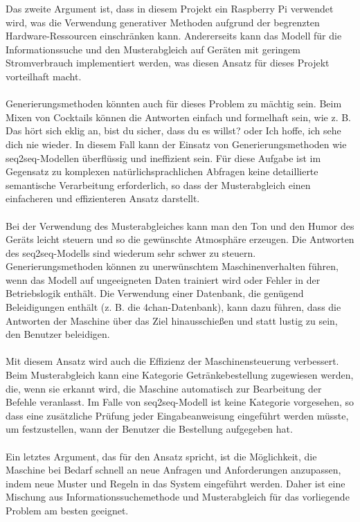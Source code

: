 Das zweite Argument ist, dass in diesem Projekt ein Raspberry Pi verwendet wird, was die Verwendung generativer Methoden aufgrund der begrenzten Hardware-Ressourcen einschränken kann.
Andererseits kann das Modell für die Informationssuche und den Musterabgleich auf Geräten mit geringem Stromverbrauch implementiert werden, was diesen Ansatz für dieses Projekt vorteilhaft macht.\\\\
Generierungsmethoden könnten auch für dieses Problem zu mächtig sein.
Beim Mixen von Cocktails können die Antworten einfach und formelhaft sein, wie z. B. \glqq{}Das hört sich eklig an, bist du sicher, dass du es willst?\grqq{} oder \glqq{}Ich hoffe, ich sehe dich nie wieder\grqq{}.
In diesem Fall kann der Einsatz von Generierungsmethoden wie seq2seq-Modellen überflüssig und ineffizient sein.
Für diese Aufgabe ist im Gegensatz zu komplexen natürlichsprachlichen Abfragen keine detaillierte semantische Verarbeitung erforderlich, so dass der Musterabgleich einen einfacheren und effizienteren Ansatz darstellt.\\\\
Bei der Verwendung des Musterabgleiches kann man den Ton und den Humor des Geräts leicht steuern und so die gewünschte Atmosphäre erzeugen.
Die Antworten des seq2seq-Modells sind wiederum sehr schwer zu steuern.
Generierungsmethoden können zu unerwünschtem Maschinenverhalten führen, wenn das Modell auf ungeeigneten Daten trainiert wird oder Fehler in der Betriebslogik enthält.
Die Verwendung einer Datenbank, die genügend Beleidigungen enthält (z. B. die 4chan-Datenbank), kann dazu führen, dass die Antworten der Maschine über das Ziel hinausschießen und statt lustig zu sein, den Benutzer beleidigen.\\\\
Mit diesem Ansatz wird auch die Effizienz der Maschinensteuerung verbessert.
Beim Musterabgleich kann eine Kategorie \glqq{}Getränkebestellung\grqq{} zugewiesen werden, die, wenn sie erkannt wird, die Maschine automatisch zur Bearbeitung der Befehle veranlasst.
Im Falle von seq2seq-Modell ist keine Kategorie vorgesehen, so dass eine zusätzliche Prüfung jeder Eingabeanweisung eingeführt werden müsste, um festzustellen, wann der Benutzer die Bestellung aufgegeben hat.\\\\
Ein letztes Argument, das für den Ansatz spricht, ist die Möglichkeit, die Maschine bei Bedarf schnell an neue Anfragen und Anforderungen anzupassen, indem neue Muster und Regeln in das System eingeführt werden.
Daher ist eine Mischung aus Informationssuchemethode und Musterabgleich für das vorliegende Problem am besten geeignet.
